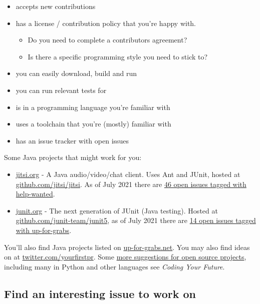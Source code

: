 \documentclass[
]{book}
\providecommand{\tightlist}{%
  \setlength{\itemsep}{0pt}\setlength{\parskip}{0pt}}
\begin{document}
\begin{itemize}
\tightlist
\item
  accepts new contributions
\item
  has a license / contribution policy that you're happy with.

  \begin{itemize}
  \tightlist
  \item
    Do you need to complete a contributors agreement?
  \item
    Is there a specific programming style you need to stick to?
  \end{itemize}
\item
  you can easily download, build and run
\item
  you can run relevant tests for
\item
  is in a programming language you're familiar with
\item
  uses a toolchain that you're (mostly) familiar with
\item
  has an issue tracker with open issues
\end{itemize}

Some Java projects that might work for you:

\begin{itemize}
\tightlist
\item
  \href{https://jitsi.org}{jitsi.org} - A Java audio/video/chat client. Uses Ant and JUnit, hosted at \href{https://github.com/jitsi/jitsi}{github.com/jitsi/jitsi}. As of July 2021 there are \href{https://github.com/jitsi/jitsi/labels/help-wanted}{46 open issues tagged with help-wanted}.
\item
  \href{http://junit.org/junit5}{junit.org} - The next generation of JUnit (Java testing). Hosted at \href{https://github.com/junit-team/junit5}{github.com/junit-team/junit5}, as of July 2021 there are \href{https://github.com/junit-team/junit5/labels/up-for-grabs}{14 open issues tagged with up-for-grabs}.
\end{itemize}

You'll also find Java projects listed on \href{http://up-for-grabs.net}{up-for-grabs.net}. You may also find ideas on at \href{https://twitter.com/yourfirstpr}{twitter.com/yourfirstpr}. Some \href{https://www.cdyf.me/experiencing.html\#opensource}{more suggestions for open source projects}, including many in Python and other languages see \emph{Coding Your Future}. \citep{experiencing}

\hypertarget{findanissue}{%
\subsection{Find an interesting issue to work on}\label{findanissue}}
\end{document}
